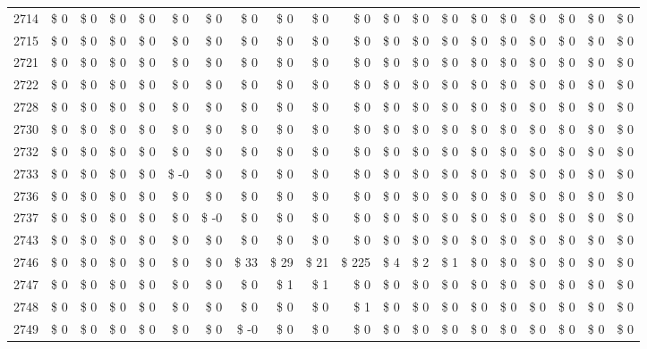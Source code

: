 \begin{longtable}{lrrrrrrrrrrrrrrrrrrr}
2714 & \$ 0 & \$ 0 & \$ 0 & \$ 0 & \$ 0 & \$ 0 & \$ 0 & \$ 0 & \$ 0 & \$ 0 & \$ 0 & \$ 0 & \$ 0 & \$ 0 & \$ 0 & \$ 0 & \$ 0 & \$ 0 & \$ 0 \\
2715 & \$ 0 & \$ 0 & \$ 0 & \$ 0 & \$ 0 & \$ 0 & \$ 0 & \$ 0 & \$ 0 & \$ 0 & \$ 0 & \$ 0 & \$ 0 & \$ 0 & \$ 0 & \$ 0 & \$ 0 & \$ 0 & \$ 0 \\
2721 & \$ 0 & \$ 0 & \$ 0 & \$ 0 & \$ 0 & \$ 0 & \$ 0 & \$ 0 & \$ 0 & \$ 0 & \$ 0 & \$ 0 & \$ 0 & \$ 0 & \$ 0 & \$ 0 & \$ 0 & \$ 0 & \$ 0 \\
2722 & \$ 0 & \$ 0 & \$ 0 & \$ 0 & \$ 0 & \$ 0 & \$ 0 & \$ 0 & \$ 0 & \$ 0 & \$ 0 & \$ 0 & \$ 0 & \$ 0 & \$ 0 & \$ 0 & \$ 0 & \$ 0 & \$ 0 \\
2728 & \$ 0 & \$ 0 & \$ 0 & \$ 0 & \$ 0 & \$ 0 & \$ 0 & \$ 0 & \$ 0 & \$ 0 & \$ 0 & \$ 0 & \$ 0 & \$ 0 & \$ 0 & \$ 0 & \$ 0 & \$ 0 & \$ 0 \\
2730 & \$ 0 & \$ 0 & \$ 0 & \$ 0 & \$ 0 & \$ 0 & \$ 0 & \$ 0 & \$ 0 & \$ 0 & \$ 0 & \$ 0 & \$ 0 & \$ 0 & \$ 0 & \$ 0 & \$ 0 & \$ 0 & \$ 0 \\
2732 & \$ 0 & \$ 0 & \$ 0 & \$ 0 & \$ 0 & \$ 0 & \$ 0 & \$ 0 & \$ 0 & \$ 0 & \$ 0 & \$ 0 & \$ 0 & \$ 0 & \$ 0 & \$ 0 & \$ 0 & \$ 0 & \$ 0 \\
2733 & \$ 0 & \$ 0 & \$ 0 & \$ 0 & \$ -0 & \$ 0 & \$ 0 & \$ 0 & \$ 0 & \$ 0 & \$ 0 & \$ 0 & \$ 0 & \$ 0 & \$ 0 & \$ 0 & \$ 0 & \$ 0 & \$ 0 \\
2736 & \$ 0 & \$ 0 & \$ 0 & \$ 0 & \$ 0 & \$ 0 & \$ 0 & \$ 0 & \$ 0 & \$ 0 & \$ 0 & \$ 0 & \$ 0 & \$ 0 & \$ 0 & \$ 0 & \$ 0 & \$ 0 & \$ 0 \\
2737 & \$ 0 & \$ 0 & \$ 0 & \$ 0 & \$ 0 & \$ -0 & \$ 0 & \$ 0 & \$ 0 & \$ 0 & \$ 0 & \$ 0 & \$ 0 & \$ 0 & \$ 0 & \$ 0 & \$ 0 & \$ 0 & \$ 0 \\
2743 & \$ 0 & \$ 0 & \$ 0 & \$ 0 & \$ 0 & \$ 0 & \$ 0 & \$ 0 & \$ 0 & \$ 0 & \$ 0 & \$ 0 & \$ 0 & \$ 0 & \$ 0 & \$ 0 & \$ 0 & \$ 0 & \$ 0 \\
2746 & \$ 0 & \$ 0 & \$ 0 & \$ 0 & \$ 0 & \$ 0 & \$ 33 & \$ 29 & \$ 21 & \$ 225 & \$ 4 & \$ 2 & \$ 1 & \$ 0 & \$ 0 & \$ 0 & \$ 0 & \$ 0 & \$ 0 \\
2747 & \$ 0 & \$ 0 & \$ 0 & \$ 0 & \$ 0 & \$ 0 & \$ 0 & \$ 1 & \$ 1 & \$ 0 & \$ 0 & \$ 0 & \$ 0 & \$ 0 & \$ 0 & \$ 0 & \$ 0 & \$ 0 & \$ 0 \\
2748 & \$ 0 & \$ 0 & \$ 0 & \$ 0 & \$ 0 & \$ 0 & \$ 0 & \$ 0 & \$ 0 & \$ 1 & \$ 0 & \$ 0 & \$ 0 & \$ 0 & \$ 0 & \$ 0 & \$ 0 & \$ 0 & \$ 0 \\
2749 & \$ 0 & \$ 0 & \$ 0 & \$ 0 & \$ 0 & \$ 0 & \$ -0 & \$ 0 & \$ 0 & \$ 0 & \$ 0 & \$ 0 & \$ 0 & \$ 0 & \$ 0 & \$ 0 & \$ 0 & \$ 0 & \$ 0 \\

\end{longtable}
